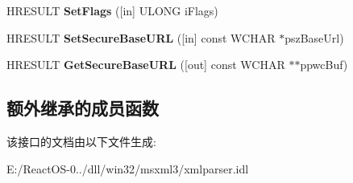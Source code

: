 \begin{DoxyCompactItemize}
H\+R\+E\+S\+U\+LT {\bfseries Set\+Flags} (\mbox{[}in\mbox{]} U\+L\+O\+NG i\+Flags)
\item 
\mbox{\label{interface_x_m_l_p_s_r_1_1_i_x_m_l_parser_a7ba7a6874fc24d9c90071531fcde605d}} 
H\+R\+E\+S\+U\+LT {\bfseries Set\+Secure\+Base\+U\+RL} (\mbox{[}in\mbox{]} const W\+C\+H\+AR $\ast$psz\+Base\+Url)
\item 
\mbox{\label{interface_x_m_l_p_s_r_1_1_i_x_m_l_parser_ab659b583ef1fe25bd5683d6a52e9a481}} 
H\+R\+E\+S\+U\+LT {\bfseries Get\+Secure\+Base\+U\+RL} (\mbox{[}out\mbox{]} const W\+C\+H\+AR $\ast$$\ast$ppwc\+Buf)
\end{DoxyCompactItemize}
\subsection*{额外继承的成员函数}


该接口的文档由以下文件生成\+:\begin{DoxyCompactItemize}
\item 
E\+:/\+React\+O\+S-\/0../dll/win32/msxml3/xmlparser.\+idl\end{DoxyCompactItemize}
